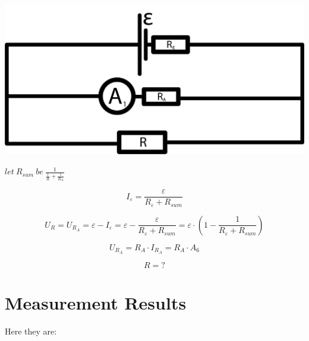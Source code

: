 \documentclass[11pt]{memoir}
\begin{document}
    \includegraphics[width=\linewidth]{../schemes/Scheme6.png}

    $let~ R_{sum} ~be~ \frac{1}{\frac{1}{R} + \frac{1}{R_A}}$

    \begin{equation*}
        I_{\varepsilon} = \frac{\varepsilon}{R_{\varepsilon} + R_{sum}}
    \end{equation*}

    \begin{equation*}
        U_R = U_{R_A} = \varepsilon - I_{\varepsilon} = \varepsilon - \frac{\varepsilon}{R_{\varepsilon} + R_{sum}}
        = \varepsilon \cdot \left( 1 - \frac{1}{R_{\varepsilon} + R_{sum}} \right)
    \end{equation*}

    \begin{equation*}
        U_{R_A} = R_A \cdot I_{R_A} = R_A \cdot A_6
    \end{equation*}

    \begin{equation}\label{eq:equation6}
        R = ?
    \end{equation}



%
%

    \newpage
    \section{Measurement Results}\label{sec:measurement-results} %

    Here they are:
\end{document}
